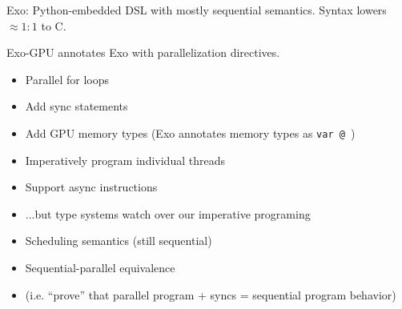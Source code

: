 \begin{minipage}[t]{0.48\textwidth}\fixminipage

Exo: Python-embedded DSL with mostly sequential semantics.
Syntax lowers $\approx 1:1$ to C.

Exo-GPU annotates Exo with parallelization directives.


\begin{itemize}
  \item Parallel for loops
  \item Add sync statements
  \item Add GPU memory types (Exo annotates memory types as \texttt{var @ })
\end{itemize}

\begin{itemize}
  \item Imperatively program individual threads
  \item Support async instructions
  \item ...but type systems watch over our imperative programing
\end{itemize}

\begin{itemize}
  \item Scheduling semantics (still sequential)
  \item Sequential-parallel equivalence
  \item (i.e. ``prove'' that parallel program + syncs = sequential program behavior)
\end{itemize}
\end{minipage}
\hfill
